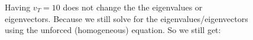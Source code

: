 \documentclass[preview]{standalone}
\begin{document}
\begin{center}
\raggedright
                Having $v_T = 10$ does not change the the eigenvalues or \\ 
                eigenvectors. Because we still solve for the eigenvalues/eigenvectors\\
                using the unforced (homogeneous) equation. So we still get:
\end{center}
\end{document}
